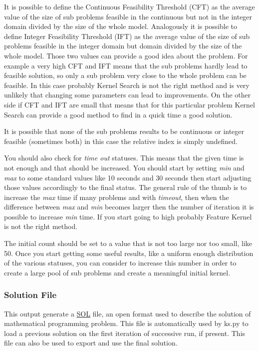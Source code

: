         It is possible to define the Continuous Feasibility Threshold (CFT) as the average value of the size of sub problems feasible in the continuous but 
        not in the integer domain divided by the size of the whole model. Analogously it is possible to define Integer Feasibility Threshold (IFT)
        as the average value of the size of sub problems feasible in the integer domain but domain divided by the size of the whole model. Those two values
        can provide a good idea about the problem. For example a very high CFT and IFT means that the sub problems hardly lead to feasible solution, so only a 
        sub problem very close to the whole problem can be feasible. In this case probably Kernel Search is not the right method and is very unlikely that
        changing some parameters can lead to improvements. On the other side if CFT and IFT are small that means that for this particular problem Kernel Search 
        can provide a good method to find in a quick time a good solution. 

        It is possible that none of the sub problems results to be continuous or integer feasible (sometimes both) in this case the relative index is simply 
        undefined. 

        You should also check for \emph{time out} statuses. This means that the given time is not enough and that should be increased. You should start by setting 
        \emph{min} and \emph{max} to some standard values like 10 seconds and 30 seconds then start adjusting those values accordingly to the final status. 
        The general rule of the thumb is to increase the \emph{max} time if many problems and with \emph{timeout}, then when the difference between \emph{max} and \emph{min}
        becomes larger then the number of iteration it is possible to increase \emph{min} time. If you start going to high 
        probably Feature Kernel is not the right method.
        
        The initial count should be set to a value that is not too large nor too small, like 50. Once you start getting some useful results, like a uniform enough distribution
        of the various statuses, you can consider to increase this number in order to create a large pool of sub problems and create a meaningful initial kernel. 


    \subsubsection{Solution File}
        This output generate a \href{https://en.wikipedia.org/wiki/Sol_(format)}{SOL} file, an open format used to describe the solution of mathematical programming
        problem. This file is automatically used by ks.py to load a previous solution on the first iteration of successive run, if present. This file can also be 
        used to export and use the final solution. 

